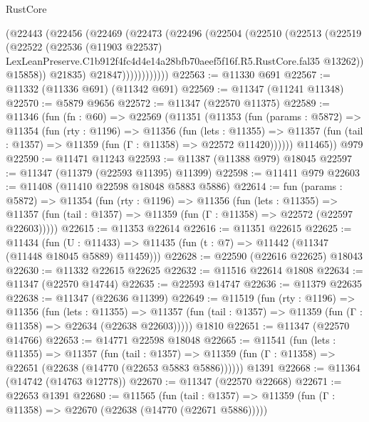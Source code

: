 \begin{lexlean}{RustCore}
\begin{coremodule}
                (@22443
                  (@22456
                    (@22469
                      (@22473
                        (@22496
                          (@22504
                            (@22510
                              (@22513
                                (@22519
                                  (@22522
                                    (@22536
                                      (@11903 @22537)
                                      LexLeanPreserve.C1b912f4fc4d4e14a28bfb70aeef5f16f.R5.RustCore.fal35
                                      @13262))
                                  @15858))
                              @21835)
                            @21847))))))))))))
@22563 := @11330 @691
@22567 := @11332 (@11336 @691) (@11342 @691)
@22569 := @11347 (@11241 @11348)
@22570 := @5879 @9656
@22572 := @11347 (@22570 @11375)
@22589 := @11346
    (fun (fn : @60) =>
    @22569
      (@11351
        (@11353
          (fun (params : @5872) =>
          @11354
            (fun (rty : @1196) =>
            @11356
              (fun (lets : @11355) =>
              @11357 (fun (tail : @1357) => @11359 (fun (Γ : @11358) => @22572 @11420))))))
        @11465))
    @979
@22590 := @11471 @11243
@22593 := @11387 (@11388 @979) @18045
@22597 := @11347 (@11379 (@22593 @11395) @11399)
@22598 := @11411 @979
@22603 := @11408 (@11410 @22598 @18048 @5883 @5886)
@22614 := fun (params : @5872) =>
  @11354
    (fun (rty : @1196) =>
    @11356
      (fun (lets : @11355) =>
      @11357 (fun (tail : @1357) => @11359 (fun (Γ : @11358) => @22572 (@22597 @22603)))))
@22615 := @11353 @22614
@22616 := @11351 @22615
@22625 := @11434
    (fun (U : @11433) => @11435 (fun (t : @7) => @11442 (@11347 (@11448 @18045 @5889) @11459)))
@22628 := @22590 (@22616 @22625) @18043
@22630 := @11332 @22615 @22625
@22632 := @11516 @22614 @1808
@22634 := @11347 (@22570 @14744)
@22635 := @22593 @14747
@22636 := @11379 @22635
@22638 := @11347 (@22636 @11399)
@22649 := @11519
    (fun (rty : @1196) =>
    @11356
      (fun (lets : @11355) =>
      @11357 (fun (tail : @1357) => @11359 (fun (Γ : @11358) => @22634 (@22638 @22603)))))
    @1810
@22651 := @11347 (@22570 @14766)
@22653 := @14771 @22598 @18048
@22665 := @11541
    (fun (lets : @11355) =>
    @11357
      (fun (tail : @1357) =>
      @11359 (fun (Γ : @11358) => @22651 (@22638 (@14770 (@22653 @5883 @5886))))))
    @1391
@22668 := @11364 (@14742 (@14763 @12778))
@22670 := @11347 (@22570 @22668)
@22671 := @22653 @1391
@22680 := @11565
    (fun (tail : @1357) => @11359 (fun (Γ : @11358) => @22670 (@22638 (@14770 (@22671 @5886)))))

\end{coremodule}
\end{lexlean}
